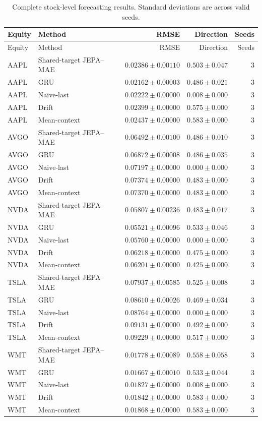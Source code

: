 \begin{longtable}{llrrr}
\caption{Complete stock-level forecasting results. Standard deviations are across valid seeds.}\label{tab:appendix_stock_metrics}\\
\toprule
Equity & Method & RMSE & Direction & Seeds \\
\midrule
\endfirsthead
\toprule
Equity & Method & RMSE & Direction & Seeds \\
\midrule
\endhead
AAPL & Shared-target JEPA--MAE & $0.02386 \pm 0.00110$ & $0.503 \pm 0.047$ & 3 \\
AAPL & GRU & $0.02162 \pm 0.00003$ & $0.486 \pm 0.021$ & 3 \\
AAPL & Naive-last & $0.02222 \pm 0.00000$ & $0.008 \pm 0.000$ & 3 \\
AAPL & Drift & $0.02399 \pm 0.00000$ & $0.575 \pm 0.000$ & 3 \\
AAPL & Mean-context & $0.02437 \pm 0.00000$ & $0.583 \pm 0.000$ & 3 \\
AVGO & Shared-target JEPA--MAE & $0.06492 \pm 0.00100$ & $0.486 \pm 0.010$ & 3 \\
AVGO & GRU & $0.06872 \pm 0.00008$ & $0.486 \pm 0.035$ & 3 \\
AVGO & Naive-last & $0.07197 \pm 0.00000$ & $0.000 \pm 0.000$ & 3 \\
AVGO & Drift & $0.07374 \pm 0.00000$ & $0.483 \pm 0.000$ & 3 \\
AVGO & Mean-context & $0.07370 \pm 0.00000$ & $0.483 \pm 0.000$ & 3 \\
NVDA & Shared-target JEPA--MAE & $0.05807 \pm 0.00236$ & $0.483 \pm 0.017$ & 3 \\
NVDA & GRU & $0.05521 \pm 0.00096$ & $0.533 \pm 0.046$ & 3 \\
NVDA & Naive-last & $0.05760 \pm 0.00000$ & $0.000 \pm 0.000$ & 3 \\
NVDA & Drift & $0.06218 \pm 0.00000$ & $0.475 \pm 0.000$ & 3 \\
NVDA & Mean-context & $0.06201 \pm 0.00000$ & $0.425 \pm 0.000$ & 3 \\
TSLA & Shared-target JEPA--MAE & $0.07937 \pm 0.00585$ & $0.525 \pm 0.008$ & 3 \\
TSLA & GRU & $0.08610 \pm 0.00026$ & $0.469 \pm 0.034$ & 3 \\
TSLA & Naive-last & $0.08764 \pm 0.00000$ & $0.000 \pm 0.000$ & 3 \\
TSLA & Drift & $0.09131 \pm 0.00000$ & $0.492 \pm 0.000$ & 3 \\
TSLA & Mean-context & $0.09229 \pm 0.00000$ & $0.517 \pm 0.000$ & 3 \\
WMT & Shared-target JEPA--MAE & $0.01778 \pm 0.00089$ & $0.558 \pm 0.058$ & 3 \\
WMT & GRU & $0.01667 \pm 0.00010$ & $0.533 \pm 0.044$ & 3 \\
WMT & Naive-last & $0.01827 \pm 0.00000$ & $0.008 \pm 0.000$ & 3 \\
WMT & Drift & $0.01842 \pm 0.00000$ & $0.583 \pm 0.000$ & 3 \\
WMT & Mean-context & $0.01868 \pm 0.00000$ & $0.583 \pm 0.000$ & 3 \\
\bottomrule
\end{longtable}
